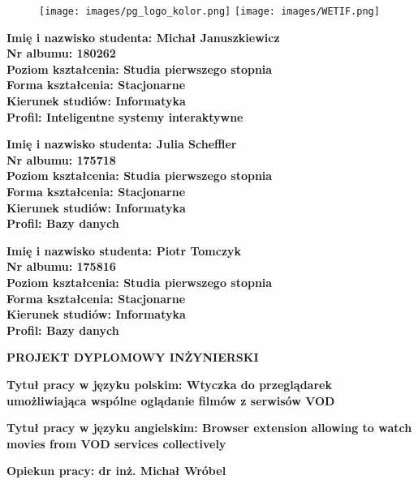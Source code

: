 \documentclass[10pt, a4paper]{article}
\begin{document}
\begin{titlepage}
    \vspace*{-3cm}
    \begin{figure}[h!]
        \hspace{-1.5cm}
        \texttt{[image: images/pg\_logo\_kolor.png]}
        \hspace{0.5cm}
        \texttt{[image: images/WETIF.png]}           
    \end{figure}

    \textbf{
        \newline 
        Imię i nazwisko studenta: Michał Januszkiewicz\\
        Nr albumu: 180262\\
        Poziom kształcenia: Studia pierwszego stopnia\\
        Forma kształcenia: Stacjonarne\\
        Kierunek studiów: Informatyka\\
        Profil: Inteligentne systemy interaktywne
    }
    
    \textbf{
        \newline 
        Imię i nazwisko studenta: Julia Scheffler\\
        Nr albumu: 175718\\
        Poziom kształcenia: Studia pierwszego stopnia\\
        Forma kształcenia: Stacjonarne\\
        Kierunek studiów: Informatyka\\
        Profil: Bazy danych
    }
    
    \textbf{
        \newline 
        Imię i nazwisko studenta: Piotr Tomczyk\\
        Nr albumu: 175816\\
        Poziom kształcenia: Studia pierwszego stopnia\\
        Forma kształcenia: Stacjonarne\\
        Kierunek studiów: Informatyka\\
        Profil: Bazy danych
    }

    \Large
    \textbf{
        \newline 
        \newline
        PROJEKT DYPLOMOWY INŻYNIERSKI
    }

    \normalsize
    \textbf{
        \newline 
        \newline
        Tytuł pracy w języku polskim: Wtyczka do przeglądarek umożliwiająca wspólne oglądanie filmów z serwisów VOD
    }

    \textbf{
        \newline
        Tytuł pracy w języku angielskim: Browser extension allowing to watch movies from VOD services collectively
    }

    \textbf{
        \newline
        \newline
        Opiekun pracy: dr inż. Michał Wróbel
    }
    
\end{titlepage}
\end{document}
